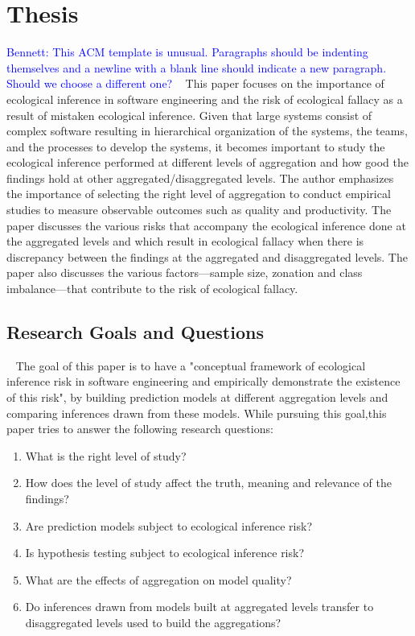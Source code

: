 \documentclass{acm_proc_article-sp}
\newcommand{\commentm}[1]{\textsf{#1}} %
\newcommand{\bennett}[1]{\commentm{\textcolor{blue}{Bennett: #1}}}
\begin{document}
\section{Thesis}\label{thesis}
\bennett{This ACM template is unusual.  Paragraphs should be indenting themselves and a newline with a blank line should indicate a new paragraph.  Should we choose a different one?}
~ This paper focuses on the importance of ecological inference in software engineering and the risk of ecological fallacy as a result of mistaken ecological inference. Given that large systems consist of complex software resulting in hierarchical organization of the systems, the teams, and the processes to develop the systems, it becomes important to study the ecological inference performed at different levels of aggregation and how good the findings hold at other aggregated/disaggregated levels. The author emphasizes the importance of selecting the right level of aggregation to conduct empirical studies to measure observable outcomes such as quality and productivity. The paper discusses the various risks that accompany the ecological inference done at the aggregated levels and which result in ecological fallacy when there is discrepancy between the findings at the aggregated and disaggregated levels. The paper also discusses the various factors---sample size, zonation and class imbalance---that contribute to the risk of ecological fallacy.

\subsection{Research Goals and Questions}
\label{thesis-rqs}
~ The goal of this paper is to have a "conceptual framework of ecological inference risk in software engineering and empirically demonstrate the existence of this risk", by building prediction models at different aggregation levels and comparing inferences drawn from these models. While pursuing this goal,this paper tries to answer the following research questions:
\begin{enumerate}
  \item What is the right level of study?
  \item How does the level of study affect the truth, meaning and relevance of the findings?
  \item Are prediction models subject to ecological inference risk?
  \item Is hypothesis testing subject to ecological inference risk?
  \item What are the effects of aggregation on model quality?
  \item Do inferences drawn from models built at aggregated levels transfer to disaggregated levels used to build the aggregations?
\end{enumerate}
\end{document}
